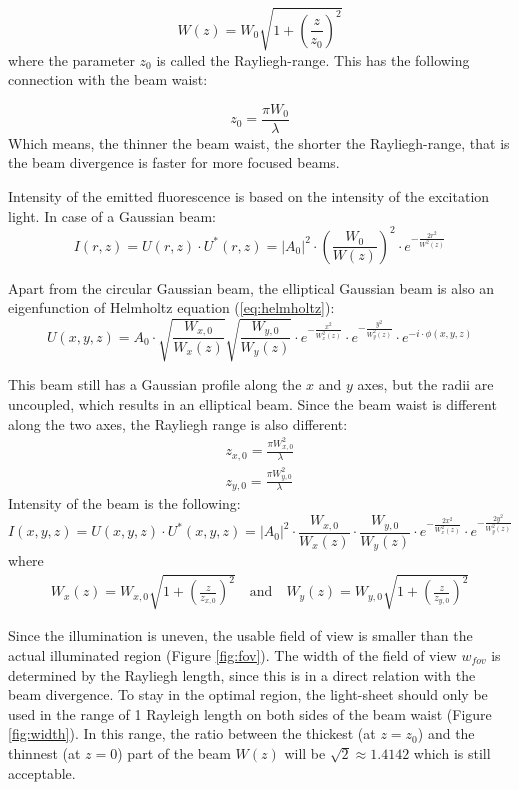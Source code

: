 \documentclass{diploma_style}
\begin{document}
\begin{equation}
	W(z) = W_0\sqrt{1+\left( \frac{z}{z_0} \right)^2}
\end{equation}
where the parameter $z_0$ is called the Rayliegh-range. This has the following connection with the beam waist:

\begin{equation}
	z_0 = \frac{\pi W_0}{\lambda}
\end{equation}
Which means, the thinner the beam waist, the shorter the Rayliegh-range, that is the beam divergence is faster for more focused beams.

Intensity of the emitted fluorescence is based on the intensity of the excitation light. In case of a Gaussian beam:
\begin{equation}
	I(r,z) = U(r,z)\cdot U^*(r,z) = |A_0|^2 \cdot \left( \frac{W_0}{W(z)}\right)^2 \cdot e^{-\frac{2r^2}{W^2(z)}}
\end{equation}

Apart from the circular Gaussian beam, the elliptical Gaussian beam is also an eigenfunction of Helmholtz equation (\ref{eq:helmholtz}):
\begin{equation}
	U(x,y,z) = A_0 \cdot \sqrt{\frac{W_{x,0}}{W_x(z)}} \sqrt{\frac{W_{y,0}}{W_y(z)}} \cdot e^{-\frac{x^2}{W_x^2(z)}} \cdot e^{-\frac{y^2}{W_y^2(z)}} \cdot e^{-i\cdot \phi(x,y,z)}
\end{equation}

This beam still has a Gaussian profile along the $x$ and $y$ axes, but the radii are uncoupled, which results in an elliptical beam. Since the beam waist is different along the two axes, the Rayliegh range is also different:
\begin{align}
	z_{x,0} = \frac{\pi W_{x,0}^2}{\lambda} \\
	z_{y,0} = \frac{\pi W_{y,0}^2}{\lambda}
\end{align}
Intensity of the beam is the following:
\begin{equation}
	I(x,y,z) = U(x,y,z)\cdot U^*(x,y,z) = |A_0|^2 \cdot \frac{W_{x,0}}{W_x(z)} \cdot \frac{W_{y,0}}{W_y(z)} \cdot e^{-\frac{2x^2}{W_x^2(z)}} \cdot e^{-\frac{2y^2}{W_y^2(z)}}
\end{equation}
where
\begin{align}
W_x(z) = W_{x,0}\sqrt{1+\left( \frac{z}{z_{x,0}} \right)^2}\mathrm{\quad and \quad } W_y(z) = W_{y,0}\sqrt{1+\left( \frac{z}{z_{y,0}} \right)^2}
\end{align}

Since the illumination is uneven, the usable field of view is smaller than the actual illuminated region (Figure \ref{fig:fov}). The width of the field of view $w_{fov}$ is determined by the Rayliegh length, since this is in a direct relation with the beam divergence. To stay in the optimal region, the light-sheet should only be used in the range of 1 Rayleigh length on both sides of the beam waist (Figure \ref{fig:width}). In this range, the ratio between the thickest (at $z=z_0$) and the thinnest (at $z=0$) part of the beam $W(z)$ will be $\sqrt{2}\approx 1.4142$ which is still acceptable.
\end{document}
